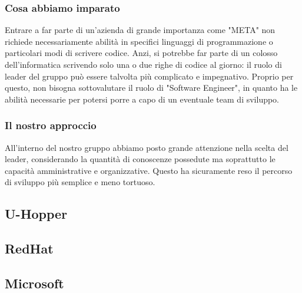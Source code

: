\documentclass{report}
\begin{document}
\subsubsection*{Cosa abbiamo imparato}
Entrare a far parte di un'azienda di grande importanza come "META" non richiede necessariamente abilità in specifici linguaggi di programmazione o particolari modi di scrivere codice. Anzi, si potrebbe far parte di un colosso dell'informatica scrivendo solo una o due righe di codice al giorno: il ruolo di leader del gruppo può essere talvolta più complicato e impegnativo. Proprio per questo, non bisogna sottovalutare il ruolo di "Software Engineer", in quanto ha le abilità necessarie per potersi porre a capo di un eventuale team di sviluppo.

\subsubsection*{Il nostro approccio}
All'interno del nostro gruppo abbiamo posto grande attenzione nella scelta del leader, considerando la quantità di conoscenze possedute ma soprattutto le capacità amministrative e organizzative. Questo ha sicuramente reso il percorso di sviluppo più semplice e meno tortuoso.


\subsection{U-Hopper}

\subsection{RedHat}

\subsection{Microsoft}
\end{document}
